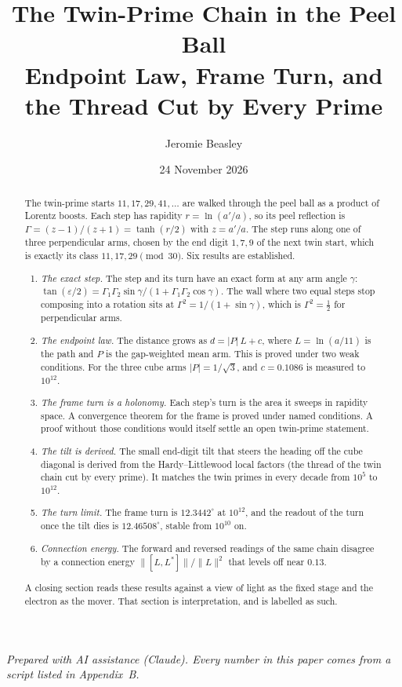 \documentclass[11pt]{article}
\title{The Twin-Prime Chain in the Peel Ball\\[4pt]\large Endpoint Law, Frame Turn, and the Thread Cut by Every Prime}
\author{Jeromie Beasley}
\date{24 November 2026}
\theoremstyle{definition}
\theoremstyle{remark}
\begin{document}
\maketitle

\begin{center}\small\emph{Prepared with AI assistance (Claude). Every number in this paper comes from a script listed in Appendix~B.}\end{center}

\begin{abstract}
The twin-prime starts $11,17,29,41,\dots$ are walked through the peel ball as a product of Lorentz boosts. Each step has rapidity $r=\ln(a'/a)$, so its peel reflection is $\Gamma=(z-1)/(z+1)=\tanh(r/2)$ with $z=a'/a$. The step runs along one of three perpendicular arms, chosen by the end digit $1,7,9$ of the next twin start, which is exactly its class $11,17,29 \pmod{30}$. Six results are established.
\begin{enumerate}
\item \emph{The exact step.} The step and its turn have an exact form at any arm angle $\gamma$: $\tan(\varepsilon/2)=\Gamma_1\Gamma_2\sin\gamma/(1+\Gamma_1\Gamma_2\cos\gamma)$. The wall where two equal steps stop composing into a rotation sits at $\Gamma^2=1/(1+\sin\gamma)$, which is $\Gamma^2=\tfrac12$ for perpendicular arms.
\item \emph{The endpoint law.} The distance grows as $d=|P|\,L+c$, where $L=\ln(a/11)$ is the path and $P$ is the gap-weighted mean arm. This is proved under two weak conditions. For the three cube arms $|P|=1/\sqrt3$, and $c=0.1086$ is measured to $10^{12}$.
\item \emph{The frame turn is a holonomy.} Each step's turn is the area it sweeps in rapidity space. A convergence theorem for the frame is proved under named conditions. A proof without those conditions would itself settle an open twin-prime statement.
\item \emph{The tilt is derived.} The small end-digit tilt that steers the heading off the cube diagonal is derived from the Hardy--Littlewood local factors (the thread of the twin chain cut by every prime). It matches the twin primes in every decade from $10^5$ to $10^{12}$.
\item \emph{The turn limit.} The frame turn is $12.3442^\circ$ at $10^{12}$, and the readout of the turn once the tilt dies is $12.46508^\circ$, stable from $10^{10}$ on.
\item \emph{Connection energy.} The forward and reversed readings of the same chain disagree by a connection energy $\|[L,L^*]\|/\|L\|^2$ that levels off near $0.13$.
\end{enumerate}
A closing section reads these results against a view of light as the fixed stage and the electron as the mover. That section is interpretation, and is labelled as such.
\end{abstract}
\end{document}
